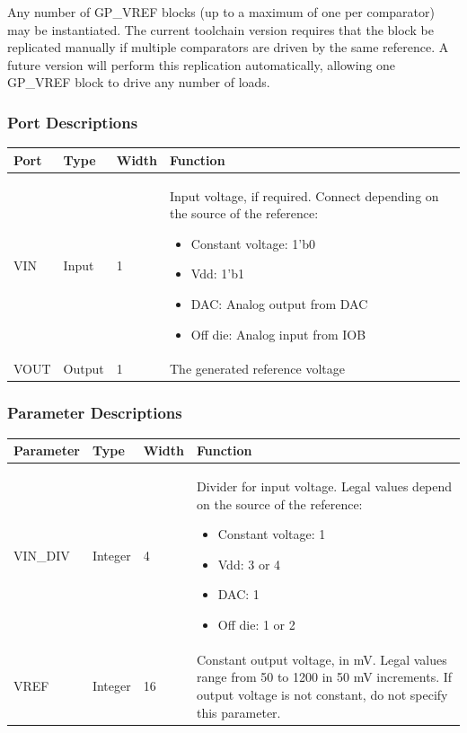 \documentclass[11pt]{article}
\begin{document}
Any number of GP\_VREF blocks (up to a maximum of one per comparator) may be instantiated. The current toolchain 
version requires that the block be replicated manually if multiple comparators are driven by the same reference. A 
future version will perform this replication automatically, allowing one GP\_VREF block to drive any number of loads.

\subsubsection{Port Descriptions}

\begin{tabularx}{5in}{|l|l|l|X|}
\hline
{\bfseries Port} & {\bfseries Type} & {\bfseries Width} & {\bfseries Function} \\
\hline
VIN & Input & 1 & Input voltage, if required. Connect depending on the source of the reference:
	\begin{itemize}
		\item Constant voltage: 1'b0
		\item Vdd: 1'b1
		\item DAC: Analog output from DAC
		\item Off die: Analog input from IOB
	\end{itemize}
\\
\hline
VOUT & Output & 1 & The generated reference voltage \\
\hline
\end{tabularx}

\subsubsection{Parameter Descriptions}

\begin{tabularx}{5in}{|l|l|l|X|}
\hline
{\bfseries Parameter} & {\bfseries Type} & {\bfseries Width} & {\bfseries Function} \\
\hline
VIN\_DIV & Integer & 4 &
	Divider for input voltage. Legal values depend on the source of the reference:
	\begin{itemize}
		\item Constant voltage: 1
		\item Vdd: 3 or 4
		\item DAC: 1
		\item Off die: 1 or 2
	\end{itemize}
\\
\hline 
VREF & Integer & 16 &
	Constant output voltage, in mV. Legal values range from 50 to 1200 in 50 mV increments.
	If output voltage is not constant, do not specify this parameter.\\
\hline
\end{tabularx}
\end{document}
